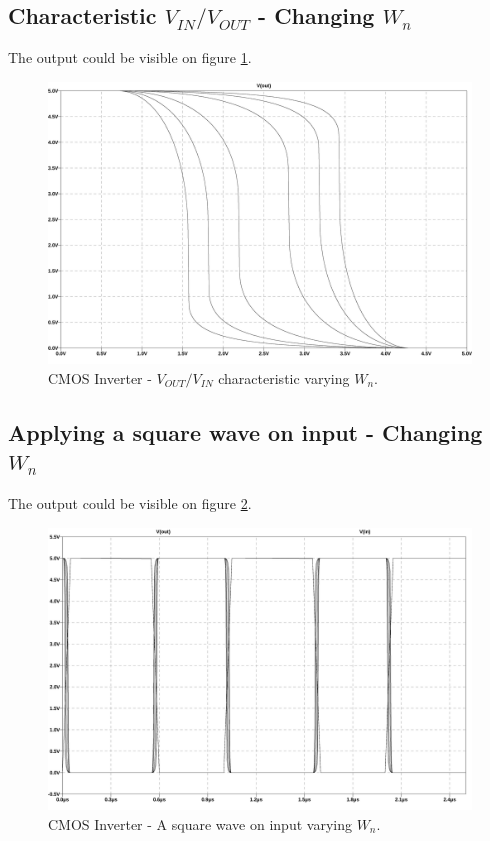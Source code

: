 \subsection{Characteristic $V_{IN}/V_{OUT}$ - Changing $W_n$}

The output could be visible on figure \ref{characteristicCWn}.
\begin{figure}[H]
  \centering
  \includegraphics[width=14cm]{graph/CMOSInverter/CharacteristicCWn.jpg}
  \caption{CMOS Inverter - $V_{OUT}/V_{IN}$ characteristic varying $W_n$.}
  \label{characteristicCWn}
\end{figure}

\subsection{Applying a square wave on input - Changing $W_n$}

The output could be visible on figure \ref{SquareWaveCWn}.
\begin{figure}[H]
  \centering
  \includegraphics[width=14cm]{graph/CMOSInverter/SquareWaveCWn.jpg}
  \caption{CMOS Inverter - A square wave on input varying $W_n$.}
  \label{SquareWaveCWn}
\end{figure}